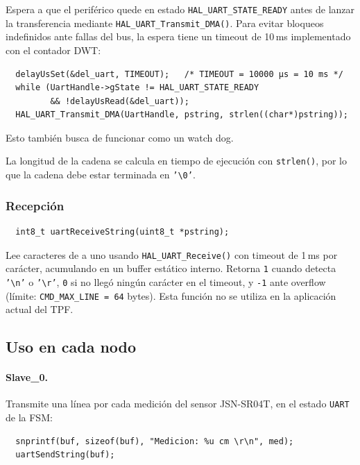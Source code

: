 \documentclass[12pt,a4paper]{article}
\begin{document}
  Espera a que el periférico quede en estado \texttt{HAL\_UART\_STATE\_READY}   
  antes de lanzar la transferencia mediante \texttt{HAL\_UART\_Transmit\_DMA()}.
   Para evitar bloqueos indefinidos ante fallas del bus, la espera tiene un     
  timeout de 10\,ms implementado con el contador DWT:

  \begin{verbatim}
  delayUsSet(&del_uart, TIMEOUT);   /* TIMEOUT = 10000 µs = 10 ms */
  while (UartHandle->gState != HAL_UART_STATE_READY                             
         && !delayUsRead(&del_uart));
  HAL_UART_Transmit_DMA(UartHandle, pstring, strlen((char*)pstring));           
  \end{verbatim}
  
  Esto también busca de funcionar como un watch dog.
                                                                                
  La longitud de la cadena se calcula en tiempo de ejecución con                
  \texttt{strlen()}, por lo que la cadena debe estar terminada en
  \texttt{'\textbackslash 0'}.                                                  

  \subsubsection{Recepción}

  \begin{verbatim}
  int8_t uartReceiveString(uint8_t *pstring);
  \end{verbatim}                                                                
  
  Lee caracteres de a uno usando \texttt{HAL\_UART\_Receive()} con timeout de   
  1\,ms por carácter, acumulando en un buffer estático interno. Retorna
  \texttt{1} cuando detecta \texttt{'\textbackslash n'} o                       
  \texttt{'\textbackslash r'}, \texttt{0} si no llegó ningún carácter en el
  timeout, y \texttt{-1} ante overflow (límite: \texttt{CMD\_MAX\_LINE = 64}
  bytes). Esta función no se utiliza en la aplicación actual del TPF.

  \subsection{Uso en cada nodo}

  \paragraph{Slave\_0.}                                                         
  Transmite una línea por cada medición del sensor JSN-SR04T, en el estado
  \texttt{UART} de la FSM:                                                      
  \begin{verbatim}
  snprintf(buf, sizeof(buf), "Medicion: %u cm \r\n", med);                      
  uartSendString(buf);                                                          
  \end{verbatim}
                                                                                
\end{document}
